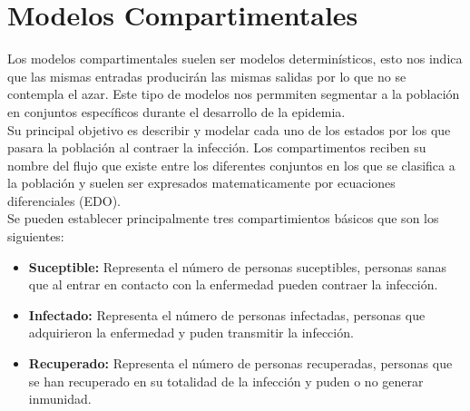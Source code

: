 
%

\chapter{Modelos Compartimentales}

Los modelos compartimentales suelen ser modelos determinísticos, esto nos indica que las mismas entradas producirán las mismas salidas por lo que no se contempla el azar. Este tipo de modelos nos permmiten segmentar a la población en conjuntos específicos durante el desarrollo de la epidemia.\\

Su principal objetivo es describir y modelar cada uno de los estados por los que pasara la población al contraer la infección.
Los compartimentos reciben su nombre del flujo que existe entre los diferentes conjuntos en los que se clasifica a la población y suelen ser expresados matematicamente por ecuaciones diferenciales (EDO).\\

Se pueden establecer principalmente tres compartimientos básicos que son los siguientes:

\begin{itemize}
\item \textbf{Suceptible:} Representa el número de personas suceptibles, personas sanas que al entrar en contacto con la enfermedad pueden contraer la infección.\\

\item \textbf{Infectado:} Representa el número de personas infectadas, personas que adquirieron la enfermedad y puden transmitir la infección.\\

\item \textbf{Recuperado:} Representa el número de personas recuperadas, personas que se han recuperado en su totalidad de la infección y puden o no generar inmunidad.
\end{itemize}

